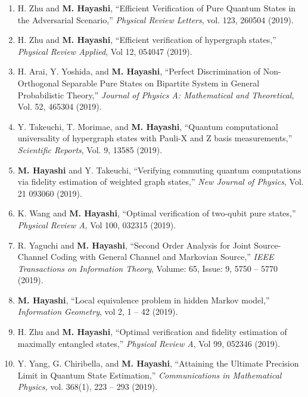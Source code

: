 \documentclass[a4paper,12pt,oneside]{article}
\begin{document}
\begin{enumerate}
\item 
H. Zhu and \textbf{M. Hayashi},
``Efficient Verification of Pure Quantum States in the Adversarial Scenario,''
{\em Physical Review Letters}, 
vol. 123, 260504 (2019).

\item 
H. Zhu and \textbf{M. Hayashi},
``Efficient verification of hypergraph states,''
{\em Physical Review Applied}, 
Vol 12, 054047 (2019).

\item 
H. Arai, Y. Yoshida, and \textbf{M. Hayashi},
``Perfect Discrimination of Non-Orthogonal Separable Pure States on Bipartite System in General Probabilistic Theory,''
{\em Journal of Physics A: Mathematical and Theoretical}, 
Vol. 52, 465304 (2019).

\item 
Y. Takeuchi, T. Morimae, and \textbf{M. Hayashi},
``Quantum computational
universality of hypergraph states with Pauli-X and Z basis measurements,''
{\em Scientific Reports}, Vol. 9, 13585 (2019).

\item 
\textbf{M. Hayashi} and Y. Takeuchi, 
``Verifying commuting quantum computations via fidelity estimation of weighted graph states,''
{\em New Journal of Physics}, Vol. 21 093060 (2019).

\item 
K. Wang and \textbf{M. Hayashi},
``Optimal verification of two-qubit pure states,''
{\em Physical Review A}, 
Vol 100, 032315 (2019).

\item 
R. Yaguchi and \textbf{M. Hayashi}, 
``Second Order Analysis for Joint Source-Channel Coding with General Channel and Markovian Source,''
{\em IEEE Transactions on Information Theory}, 
Volume: 65, Issue: 9, 5750 -- 5770 (2019). 

\item 
\textbf{M. Hayashi}, 
``Local equivalence problem in hidden Markov model,''
{\em Information Geometry}, 
vol 2, 1 -- 42 (2019). 

\item 
H. Zhu and \textbf{M. Hayashi}, 
``Optimal verification and fidelity estimation of maximally entangled states,''
{\em Physical Review A}, Vol 99, 052346 (2019).

\item 
Y. Yang, G. Chiribella, and \textbf{M. Hayashi}, 
``Attaining the Ultimate Precision Limit in Quantum State Estimation,''
{\em Communications in Mathematical Physics,}
vol. 368(1), 223 -- 293 (2019). 


\end{enumerate}
\end{document}
